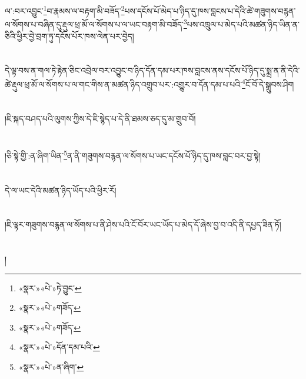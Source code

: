 ལ་:བར་འབྱུང་\footnote{«སྣར་»«པེ་»ཏེ་བྱུང་}བ་རྣམས་ལ་བརྟག་མི་བཟོད་\footnote{«སྣར་»«པེ་»གཟོད་}པས་དངོས་པོ་མེད་པ་ཉིད་དུ་ཁས་བླངས་པ་དེའི་ཚེ་གཟུགས་བརྙན་ལ་སོགས་པ་བཞིན་དུ་རྡུལ་ཕྲ་མོ་ལ་སོགས་པ་ལ་ཡང་བརྟག་མི་བཟོད་\footnote{«སྣར་»«པེ་»གཟོད་}པས་འཁྲུལ་པ་མེད་པའི་མཚན་ཉིད་ཡིན་ན་ཅིའི་ཕྱིར་བྱེ་བྲག་ཏུ་དངོས་པོར་ཁས་ལེན་པར་བྱེད།\chapter{ }དེ་ལྟ་བས་ན་གལ་ཏེ་རྟེན་ཅིང་འབྲེལ་བར་འབྱུང་བ་ཉིད་དོན་དམ་པར་ཁས་བླངས་ནས་དངོས་པོ་ཉིད་དུ་སྨྲ་ན་ནི་དེའི་ཚེ་རྡུལ་ཕྲ་མོ་ལ་སོགས་པ་ལ་གང་གིས་ན་མཚན་ཉིད་འགྲུབ་པར་:འགྱུར་བ་དོན་དམ་པ་པའི་\footnote{«སྣར་»«པེ་»དོན་དམ་པའི་}ངོ་བོ་དེ་སྒྲུབས་ཤིག\chapter{ }།ཇི་སྐད་བཤད་པའི་ལུགས་ཀྱིས་དེ་ཇི་སྙེད་པ་དེ་ནི་ཐམས་ཅད་དུ་མ་གྲུབ་བོ།\chapter{ }།ཅི་སྟེ་གྱི་:ན་ཞིག་ཡིན་\footnote{«སྣར་»«པེ་»ན་ཞིག་}ན་ནི་གཟུགས་བརྙན་ལ་སོགས་པ་ཡང་དངོས་པོ་ཉིད་དུ་ཁས་བླང་བར་བྱ་སྟེ།\chapter{ }དེ་ལ་ཡང་དེའི་མཚན་ཉིད་ཡོད་པའི་ཕྱིར་རོ།\chapter{ }།ཇི་ལྟར་གཟུགས་བརྙན་ལ་སོགས་པ་ནི་ཤེས་པའི་ངོ་བོར་ཡང་ཡོད་པ་མེད་དོ་ཞེས་བྱ་བ་འདི་ནི་དཔྱད་ཟིན་ཏོ།\chapter{ }།
